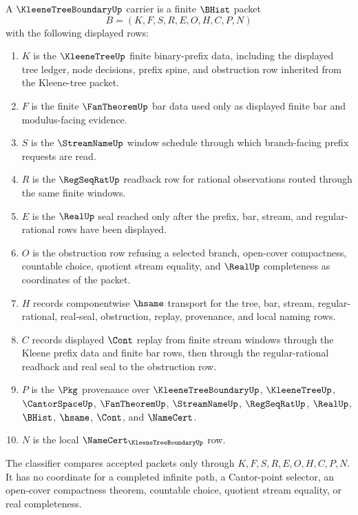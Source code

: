 \begin{definition}
\label{def:kleene-tree-boundary-carrier}
A $\KleeneTreeBoundaryUp$ carrier is a finite $\BHist$ packet
$$
B=(K,F,S,R,E,O,H,C,P,N)
$$
with the following displayed rows:
\begin{enumerate}
\item $K$ is the $\KleeneTreeUp$ finite binary-prefix data, including the displayed tree ledger, node decisions, prefix spine, and obstruction row inherited from the Kleene-tree packet.
\item $F$ is the finite $\FanTheoremUp$ bar data used only as displayed finite bar and modulus-facing evidence.
\item $S$ is the $\StreamNameUp$ window schedule through which branch-facing prefix requests are read.
\item $R$ is the $\RegSeqRatUp$ readback row for rational observations routed through the same finite windows.
\item $E$ is the $\RealUp$ seal reached only after the prefix, bar, stream, and regular-rational rows have been displayed.
\item $O$ is the obstruction row refusing a selected branch, open-cover compactness, countable choice, quotient stream equality, and $\RealUp$ completeness as coordinates of the packet.
\item $H$ records componentwise $\hsame$ transport for the tree, bar, stream, regular-rational, real-seal, obstruction, replay, provenance, and local naming rows.
\item $C$ records displayed $\Cont$ replay from finite stream windows through the Kleene prefix data and finite bar rows, then through the regular-rational readback and real seal to the obstruction row.
\item $P$ is the $\Pkg$ provenance over $\KleeneTreeBoundaryUp$, $\KleeneTreeUp$, $\CantorSpaceUp$, $\FanTheoremUp$, $\StreamNameUp$, $\RegSeqRatUp$, $\RealUp$, $\BHist$, $\hsame$, $\Cont$, and $\NameCert$.
\item $N$ is the local $\NameCert_{\KleeneTreeBoundaryUp}$ row.
\end{enumerate}
The classifier compares accepted packets only through $K,F,S,R,E,O,H,C,P,N$. It has no coordinate for a completed infinite path, a Cantor-point selector, an open-cover compactness theorem, countable choice, quotient stream equality, or real completeness.
\end{definition}

